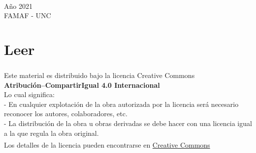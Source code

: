 \documentclass[a4paper,12pt,twoside,spanish,reqno,dottedtoc]{scrbook}
\begin{document}
	
	\begin{titlepage}
		
		\begin{addmargin}[-1cm]{-3cm}
			\begin{center}
				\large
				
				\hfill
				\vfill
				
				\begingroup
				\color{Maroon} \\ \bigskip %
				\endgroup
				
				
				\vfill
				
		
				
				Año 2021   \\ FAMAF  - UNC\\ \medskip %
				
				
				\vfill
				
			\end{center}
		\end{addmargin}
		
	\end{titlepage}
	


	
	\begingroup

	\let\clearpage\relax
	\let\cleardoublepage\relax
	\let\cleardoublepage\relax
	
	\chapter*{Leer}
	
	

	${}^{}$\\
	{\flushleft 
		Este material es distribuido bajo la licencia Creative Commons} \\
		\center  	\textbf{Atribución--CompartirIgual 4.0 Internacional}
	\\ 
	\center  Lo cual significa: 
	\\
	\flushleft
	- En cualquier explotación de la obra autorizada por la licencia será necesario reconocer los autores, colaboradores, etc.\\
	- La distribución de la obra u obras derivadas se debe hacer con una licencia igual a la que regula la obra original.\\
	${}^{}$
	\\
	Los detalles de la licencia pueden encontrarse en \href{https://creativecommons.org/licenses/by/4.0/deed.es}{Creative Commons}
	\vskip 1cm 
	\endgroup
\end{document}

